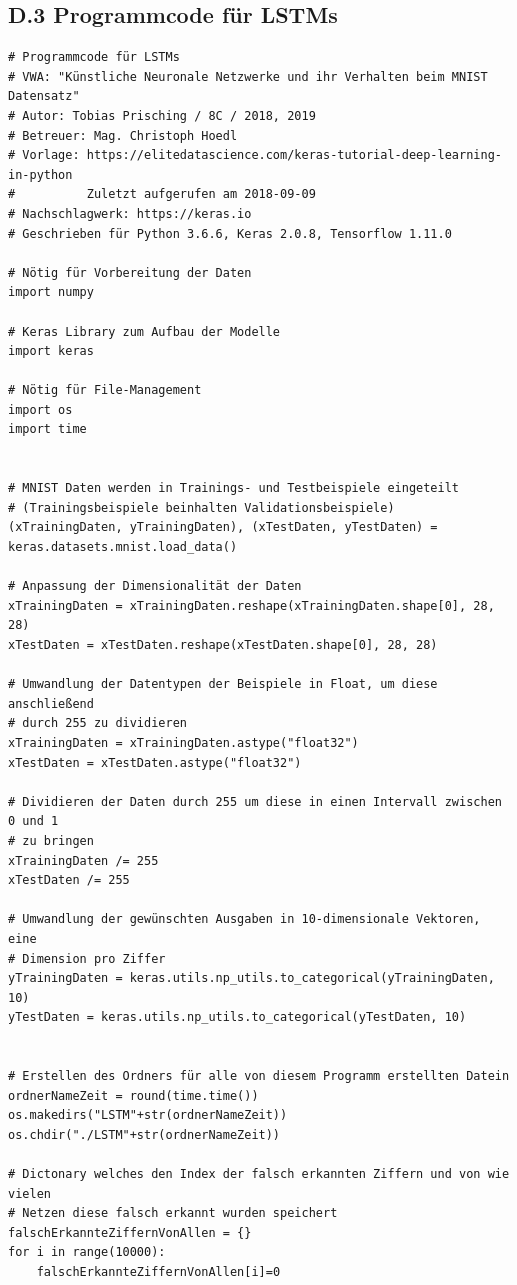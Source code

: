 \documentclass[a4paper,12pt,ngerman,oneside]{scrreprt}	%
\begin{document}
		\newpage
		\subsection*{D.3 Programmcode für LSTMs}
		{\renewcommand*{\ttdefault}{txtt}
			\begin{lstlisting}
# Programmcode für LSTMs
# VWA: "Künstliche Neuronale Netzwerke und ihr Verhalten beim MNIST Datensatz"
# Autor: Tobias Prisching / 8C / 2018, 2019
# Betreuer: Mag. Christoph Hoedl
# Vorlage: https://elitedatascience.com/keras-tutorial-deep-learning-in-python
#          Zuletzt aufgerufen am 2018-09-09
# Nachschlagwerk: https://keras.io
# Geschrieben für Python 3.6.6, Keras 2.0.8, Tensorflow 1.11.0

# Nötig für Vorbereitung der Daten
import numpy

# Keras Library zum Aufbau der Modelle
import keras

# Nötig für File-Management
import os
import time


# MNIST Daten werden in Trainings- und Testbeispiele eingeteilt
# (Trainingsbeispiele beinhalten Validationsbeispiele)
(xTrainingDaten, yTrainingDaten), (xTestDaten, yTestDaten) = keras.datasets.mnist.load_data()

# Anpassung der Dimensionalität der Daten
xTrainingDaten = xTrainingDaten.reshape(xTrainingDaten.shape[0], 28, 28)
xTestDaten = xTestDaten.reshape(xTestDaten.shape[0], 28, 28)

# Umwandlung der Datentypen der Beispiele in Float, um diese anschließend
# durch 255 zu dividieren
xTrainingDaten = xTrainingDaten.astype("float32")
xTestDaten = xTestDaten.astype("float32")

# Dividieren der Daten durch 255 um diese in einen Intervall zwischen 0 und 1
# zu bringen
xTrainingDaten /= 255
xTestDaten /= 255

# Umwandlung der gewünschten Ausgaben in 10-dimensionale Vektoren, eine
# Dimension pro Ziffer
yTrainingDaten = keras.utils.np_utils.to_categorical(yTrainingDaten, 10)
yTestDaten = keras.utils.np_utils.to_categorical(yTestDaten, 10)


# Erstellen des Ordners für alle von diesem Programm erstellten Datein
ordnerNameZeit = round(time.time())
os.makedirs("LSTM"+str(ordnerNameZeit))
os.chdir("./LSTM"+str(ordnerNameZeit))

# Dictonary welches den Index der falsch erkannten Ziffern und von wie vielen
# Netzen diese falsch erkannt wurden speichert
falschErkannteZiffernVonAllen = {}
for i in range(10000):
	falschErkannteZiffernVonAllen[i]=0



\end{lstlisting}}
\end{document}
